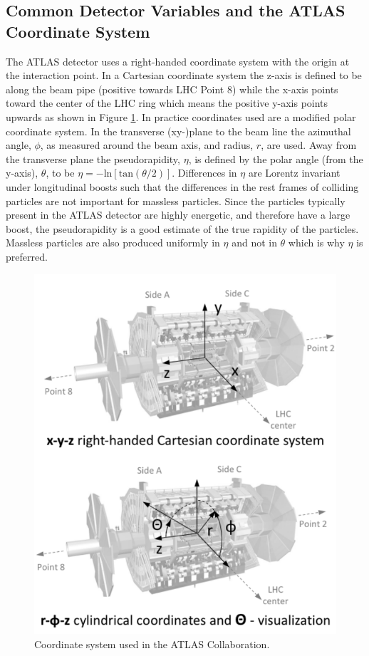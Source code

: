 \subsection{Common Detector Variables and the ATLAS Coordinate System}
The ATLAS detector uses a right-handed coordinate system with the origin at the interaction point.  In a Cartesian coordinate system the z-axis is defined to be along the beam pipe (positive towards LHC Point 8) while the x-axis points toward the center of the LHC ring which means the positive y-axis points upwards as shown in Figure \ref{fig:ATLASCoords}.  In practice coordinates used are a modified polar coordinate system.  In the transverse (xy-)plane to the beam line the azimuthal angle, $\phi$, as measured around the beam axis, and radius, $r$, are used.  Away from the transverse plane the pseudorapidity, $\eta$, is defined by the polar angle (from the y-axis), $\theta$, to be $\eta= -\text{ln}[\text{tan}(\theta/2)]$.  Differences in $\eta$ are Lorentz invariant under longitudinal boosts such that the differences in the rest frames of colliding particles are not important for massless particles.  Since the particles typically present in the ATLAS detector are highly energetic, and therefore have a large boost, the pseudorapidity is a good estimate of the true rapidity of the particles.  Massless particles are also produced uniformly in $\eta$ and not in $\theta$  which is why $\eta$ is preferred.

\begin{figure}[ht!]
	\centering
	\includegraphics[width=0.5\columnwidth]{../ThesisImages/LHCImages/ATLASCoords.png}
	\caption[Coordinate system used in the ATLAS Collaboration.]{Coordinate system used in the ATLAS Collaboration\cite{ATLASCoords}.
	}
	\label{fig:ATLASCoords}
\end{figure}

